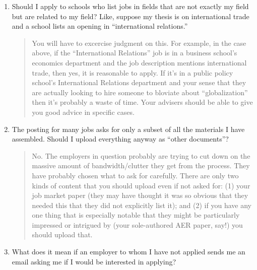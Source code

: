 \documentclass{\classes/econtex}
\providecommand\phantomsection{}
\begin{document}
\begin{enumerate}
\begin{quote}
    We have found that under these guidelines, most students apply to around
    50-100 employers, though numbers can vary depending on circumstances 
    (e.g.\ a student with a Fulbright that requires them to apply only in 
    Europe may have a much more restricted set of potential choices,
    and therefore will apply to fewer employers than students who face
    no such restrictions).


    \ifdvi\phantomsection\hypertarget{FedHiringRules}{}\fi

  \end{quote}
\item  Should I apply to schools who list jobs in fields that are not exactly my field but are related to my
  field?  Like, suppose my thesis is on international trade and a school lists
  an opening in ``international relations.''

  \begin{quote}
    You will have to excercise judgment on this.  For example, in the case
    above, if the ``International Relations'' job is in a business
    school's economics department and the job description mentions
    international trade, then yes, it is reasonable to apply.  If it's in
    a public policy school's International Relations department and your
    sense that they are actually looking to hire someone to bloviate about
    ``globalization'' then it's probably a waste of time.  Your advisers
    should be able to give you good advice in specific cases.

  \end{quote}
\item  The {\JOE} posting for many jobs asks for only a subset of all the materials I have assembled.  Should I upload everything anyway as ``other documents''?

  \begin{quote}
    No. The employers in question probably are trying to cut down on the massive amount of bandwidth/clutter they get from the process.  They have probably chosen what to ask for carefully.  There are only two kinds of content that you should upload even if not asked for: (1) your job market paper (they may have thought it was so obvious that they needed this that they did not explicitly list it); and (2) if you have any one thing that is especially notable that they might be particularly impressed or intrigued by (your sole-authored AER paper, say!) you should upload that.

  \end{quote}
\item  What does it mean if an employer to whom I have not applied sends me an email asking me if I would be interested in applying?


\end{enumerate}
\end{document}
